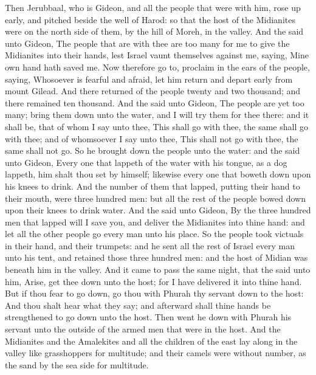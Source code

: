 \begin{biblechapter} %
 Then Jerubbaal, who is Gideon, and all the people that were with him, rose up early, and pitched beside the well of Harod: so that the host of the Midianites were on the north side of them, by the hill of Moreh, in the valley.
\verse And the \LORD said unto Gideon, The people that are with thee are too many for me to give the Midianites into their hands, lest Israel vaunt themselves against me, saying, Mine own hand hath saved me.
\verse Now therefore go to, proclaim in the ears of the people, saying, Whosoever is fearful and afraid, let him return and depart early from mount Gilead. And there returned of the people twenty and two thousand; and there remained ten thousand.
\verse And the \LORD said unto Gideon, The people are yet too many; bring them down unto the water, and I will try them for thee there: and it shall be, that of whom I say unto thee, This shall go with thee, the same shall go with thee; and of whomsoever I say unto thee, This shall not go with thee, the same shall not go.
\verse So he brought down the people unto the water: and the \LORD said unto Gideon, Every one that lappeth of the water with his tongue, as a dog lappeth, him shalt thou set by himself; likewise every one that boweth down upon his knees to drink.
\verse And the number of them that lapped, putting their hand to their mouth, were three hundred men: but all the rest of the people bowed down upon their knees to drink water.
\verse And the \LORD said unto Gideon, By the three hundred men that lapped will I save you, and deliver the Midianites into thine hand: and let all the other people go every man unto his place.
\verse So the people took victuals in their hand, and their trumpets: and he sent all the rest of Israel every man unto his tent, and retained those three hundred men: and the host of Midian was beneath him in the valley.
\verse And it came to pass the same night, that the \LORD said unto him, Arise, get thee down unto the host; for I have delivered it into thine hand.
\verse But if thou fear to go down, go thou with Phurah thy servant down to the host:
\verse And thou shalt hear what they say; and afterward shall thine hands be strengthened to go down unto the host. Then went he down with Phurah his servant unto the outside of the armed men that were in the host.
\verse And the Midianites and the Amalekites and all the children of the east lay along in the valley like grasshoppers for multitude; and their camels were without number, as the sand by the sea side for multitude.

\end{biblechapter}
